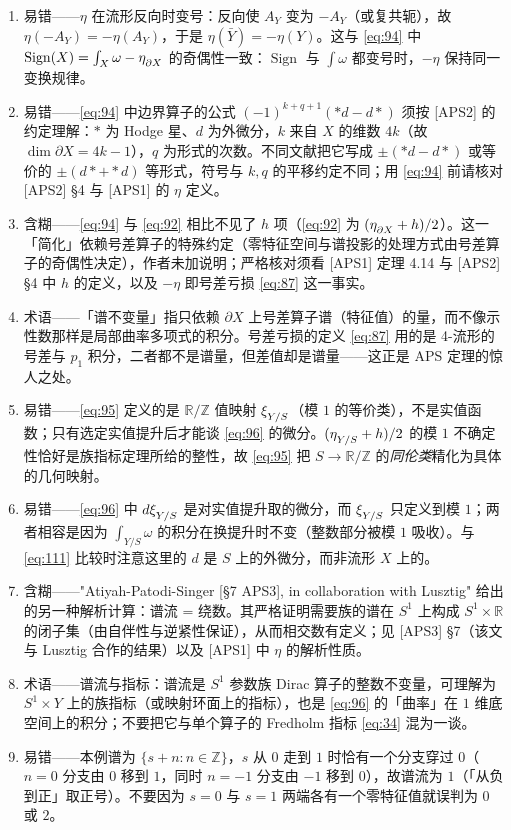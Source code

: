 \documentclass[11pt]{amsart}
\theoremstyle{definition}
\theoremstyle{remark}
\theoremstyle{plain}
\numberwithin{equation}{section}
\renewcommand{\:}{\colon}
\newcommand{\RR}{{\mathbb R}}
\newcommand{\ZZ}{{\mathbb Z}}
\newcommand{\cir}{S^1}
\DeclareRobustCommand{\mstrut}{^{\vphantom{1*\prime y\vee M}}}
\DeclareMathOperator{\Sign}{Sign}
\newcommand{\RZ}{\RR/\ZZ}
\newcommand{\bX}{\partial X}
\newcommand{\et}[1]{\eta \mstrut _{#1}}
\newcommand{\xia}[1]{\xi \mstrut _{#1}}
\begin{document}
\begin{enumerate}[leftmargin=2.2em,itemsep=2pt,topsep=2pt]
  \item 易错——$\eta$ 在流形反向时变号：反向使 $A_Y$ 变为 $-A_Y$（或复共轭），故 $\eta(-A_Y)=-\eta(A_Y)$，于是 $\eta(\bar Y)=-\eta(Y)$。这与 \eqref{eq:94} 中 $\Sign(X)=\int_X\omega-\et{\bX}$ 的奇偶性一致：$\Sign$ 与 $\int\omega$ 都变号时，$-\eta$ 保持同一变换规律。
  \item 易错——\eqref{eq:94} 中边界算子的公式 $(-1)^{k+q+1}(*d-d*)$ 须按 [APS2] 的约定理解：$*$ 为 Hodge 星、$d$ 为外微分，$k$ 来自 $X$ 的维数 $4k$（故 $\dim\bX=4k-1$），$q$ 为形式的次数。不同文献把它写成 $\pm(*d-d*)$ 或等价的 $\pm(d*+*d)$ 等形式，符号与 $k,q$ 的平移约定不同；用 \eqref{eq:94} 前请核对 [APS2] §4 与 [APS1] 的 $\eta$ 定义。
  \item 含糊——\eqref{eq:94} 与 \eqref{eq:92} 相比不见了 $h$ 项（\eqref{eq:92} 为 $(\et{\bX}+h)/2$）。这一「简化」依赖号差算子的特殊约定（零特征空间与谱投影的处理方式由号差算子的奇偶性决定），作者未加说明；严格核对须看 [APS1] 定理 4.14 与 [APS2] §4 中 $h$ 的定义，以及 $-\eta$ 即号差亏损 \eqref{eq:87} 这一事实。
  \item 术语——「谱不变量」指只依赖 $\bX$ 上号差算子谱（特征值）的量，而不像示性数那样是局部曲率多项式的积分。号差亏损的定义 \eqref{eq:87} 用的是 4-流形的号差与 $p_1$ 积分，二者都不是谱量，但差值却是谱量——这正是 APS 定理的惊人之处。
  \item 易错——\eqref{eq:95} 定义的是 $\RZ$ 值映射 $\xia{Y/S}$（模 $1$ 的等价类），不是实值函数；只有选定实值提升后才能谈 \eqref{eq:96} 的微分。$(\et{Y/S}+h)/2$ 的模 $1$ 不确定性恰好是族指标定理所给的整性，故 \eqref{eq:95} 把 $S\to\RZ$ 的\emph{同伦类}精化为具体的几何映射。
  \item 易错——\eqref{eq:96} 中 $d\xia{Y/S}$ 是对实值提升取的微分，而 $\xia{Y/S}$ 只定义到模 $1$；两者相容是因为 $\int_{Y/S}\omega$ 的积分在换提升时不变（整数部分被模 $1$ 吸收）。与 \eqref{eq:111} 比较时注意这里的 $d$ 是 $S$ 上的外微分，而非流形 $X$ 上的。
  \item 含糊——"Atiyah-Patodi-Singer [§7 APS3], in collaboration with Lusztig" 给出的另一种解析计算：谱流 = 绕数。其严格证明需要族的谱在 $\cir$ 上构成 $\cir\times\RR$ 的闭子集（由自伴性与逆紧性保证），从而相交数有定义；见 [APS3] §7（该文与 Lusztig 合作的结果）以及 [APS1] 中 $\eta$ 的解析性质。
  \item 术语——谱流与指标：谱流是 $\cir$ 参数族 Dirac 算子的整数不变量，可理解为 $\cir\times Y$ 上的族指标（或映射环面上的指标），也是 \eqref{eq:96} 的「曲率」在 $1$ 维底空间上的积分；不要把它与单个算子的 Fredholm 指标 \eqref{eq:34} 混为一谈。
  \item 易错——本例谱为 $\{s+n:n\in \ZZ\}$，$s$ 从 $0$ 走到 $1$ 时恰有一个分支穿过 $0$（$n=0$ 分支由 $0$ 移到 $1$，同时 $n=-1$ 分支由 $-1$ 移到 $0$），故谱流为 $1$（「从负到正」取正号）。不要因为 $s=0$ 与 $s=1$ 两端各有一个零特征值就误判为 $0$ 或 $2$。

\end{enumerate}
\end{document}
